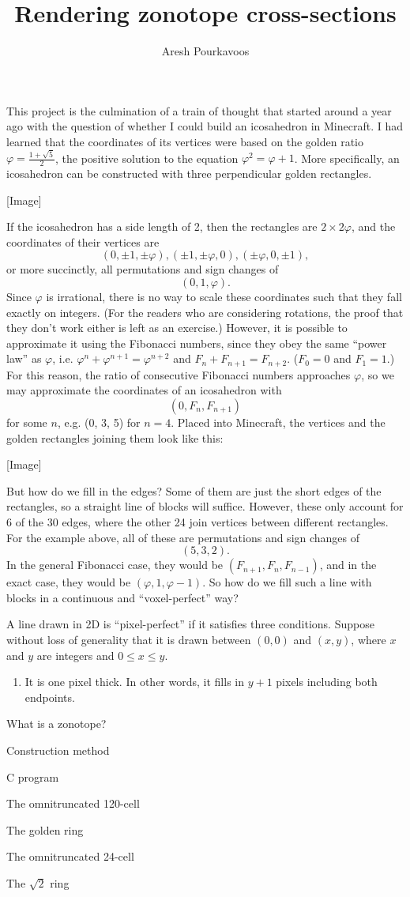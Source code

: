 \documentclass{article}
\begin{document}
\title{Rendering zonotope cross-sections}
\author{Aresh Pourkavoos}
\maketitle

This project is the culmination of a train of thought
that started around a year ago
with the question of whether I could build an icosahedron in Minecraft.
I had learned that the coordinates of its vertices
were based on the golden ratio $\varphi = \frac{1+\sqrt{5}}{2}$,
the positive solution to the equation $\varphi^2 = \varphi+1$.
More specifically,
an icosahedron can be constructed with three perpendicular golden rectangles.

[Image]

If the icosahedron has a side length of 2,
then the rectangles are $2 \times 2\varphi$,
and the coordinates of their vertices are
\[
(0, \pm 1, \pm \varphi),
(\pm 1, \pm \varphi, 0),
(\pm \varphi, 0, \pm 1),
\]
or more succinctly,
all permutations and sign changes of
\[(0, 1, \varphi).\]
Since $\varphi$ is irrational,
there is no way to scale these coordinates
such that they fall exactly on integers.
(For the readers who are considering rotations,
the proof that they don't work either is left as an exercise.)
However, it is possible to approximate it using the Fibonacci numbers,
since they obey the same ``power law'' as $\varphi$,
i.e. $\varphi^{n}+\varphi^{n+1}=\varphi^{n+2}$ and $F_n+F_{n+1}=F_{n+2}$.
($F_0=0$ and $F_1=1$.)
For this reason, the ratio of consecutive Fibonacci numbers approaches $\varphi$,
so we may approximate the coordinates of an icosahedron with
\[(0, F_n, F_{n+1})\]
for some $n$,
e.g. (0, 3, 5) for $n=4$.
Placed into Minecraft, the vertices and the golden rectangles joining them look like this:

[Image]

But how do we fill in the edges?
Some of them are just the short edges of the rectangles,
so a straight line of blocks will suffice.
However, these only account for 6 of the 30 edges,
where the other 24 join vertices between different rectangles.
For the example above,
all of these are permutations and sign changes of
\[(5, 3, 2).\]
In the general Fibonacci case,
they would be $(F_{n+1}, F_n, F_{n-1})$,
and in the exact case,
they would be $(\varphi, 1, \varphi-1)$.
So how do we fill such a line with blocks
in a continuous and ``voxel-perfect'' way?

A line drawn in 2D
is ``pixel-perfect'' if it satisfies three conditions.
Suppose without loss of generality
that it is drawn between $(0, 0)$ and $(x, y)$,
where $x$ and $y$ are integers and $0 \leq x \leq y$.
\begin{enumerate}
\item
  It is one pixel thick.
  In other words, it fills in $y+1$ pixels including both endpoints.
\end{enumerate}

What is a zonotope?

Construction method

C program

The omnitruncated 120-cell

The golden ring

The omnitruncated 24-cell

The $\sqrt{2}$ ring
\end{document}
